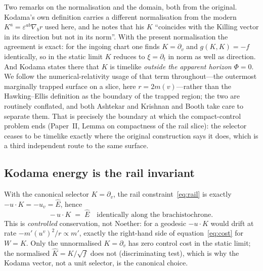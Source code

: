 \documentclass[12pt]{iopart}
\newcommand{\Ehat}{\hat E}
\theoremstyle{plain}
\theoremstyle{definition}
\theoremstyle{plain}
\theoremstyle{remark}
\begin{document}
Two remarks on the normalisation and the domain, both from the original.
Kodama's own definition \cite[Eq.~(3.6)]{Kodama1980} carries a different
normalisation from the modern $K^a=\varepsilon^{ab}\nabla_br$ used here, and he
notes that his $K$ ``coincides with the Killing vector in its direction but not
in its norm''. With the present normalisation the agreement is exact: for the
ingoing chart one finds $K=\partial_v$ and $g(K,K)=-f$ identically, so in the
static limit $K$ reduces to $\xi=\partial_t$ in norm as well as direction. And
Kodama states there that $K$ is timelike \emph{outside the apparent horizon}
$\Phi=0$. We follow the numerical-relativity usage of that term throughout---the
outermost marginally trapped surface on a slice, here $r=2m(v)$---rather than the
Hawking--Ellis definition as the boundary of the trapped region; the two are
routinely conflated, and both Ashtekar and Krishnan
\cite[footnote~1]{AshtekarKrishnan2003} and Booth
\cite[\S1]{Booth2005} take care to separate them. That is precisely the boundary at which the compact-control problem
ends (Paper~II, Lemma on compactness of the rail slice): the selector ceases to
be timelike exactly where the original construction says it does, which is a
third independent route to the same surface.

\subsection{Kodama energy is the rail invariant}
\label{sec:kodama-energy}
With the canonical selector $K=\partial_v$, the rail constraint~\eqref{eq:rail} is
exactly $-u\cdot K=-u_v=\Ehat$, hence
\begin{equation}
    -\,u\cdot K \;=\; \Ehat \quad\text{identically along the brachistochrone.}
    \label{eq:kodama-conserved}
\end{equation}
This is \emph{controlled} conservation, not Noether: for a geodesic
$-u\cdot K$ would drift at rate $-m'(u^v)^2/r\propto m'$, exactly the
right-hand side of equation~\eqref{eq:cost} for $W=K$. Only the unnormalised
$K=\partial_v$ has zero control cost in the static limit; the normalised
$\hat K=K/\sqrt f$ does not (discriminating test), which is why the Kodama
vector, not a unit selector, is the canonical choice.
\end{document}
